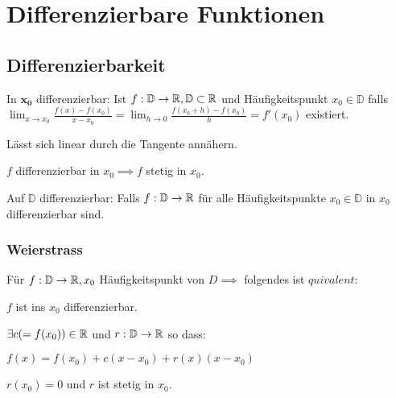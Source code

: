 
\section{Differenzierbare Funktionen}
\subsection{Differenzierbarkeit}
\begin{compactdesc}
    \item[In $\mathbf{x_0}$ differenzierbar:] Ist $f: \mathbb{D} \to \mathbb{R}, \mathbb{D} \subset \mathbb{R}$ und  Häufigkeitspunkt $x_0 \in \mathbb{D}$ falls $\lim_{x \to x_0} \frac{f(x) - f(x_0)}{x - x_0} = \lim_{h \to 0} \frac{f(x_0 + h) - f(x_0)}{h} = f'(x_0)$ existiert.
        \begin{compactitem}
            \item Lässt sich linear durch die Tangente annähern.
            \item $f$ differenzierbar in $x_0 \implies f$ stetig in $x_0$.
        \end{compactitem}
    \item[Auf $\mathbb{D}$ differenzierbar:] Falls $f : \mathbb{D} \to \mathbb{R}$ für alle Häufigkeitspunkte $x_0 \in \mathbb{D}$ in $x_0$ differenzierbar sind.
\end{compactdesc}

\subsubsection{Weierstrass}
Für $f: \mathbb{D} \to \mathbb{R}, x_0$ Häufigkeitspunkt von $D \implies$ folgendes ist $quivalent$:
\begin{compactenum}
    \item $f$ ist ins $x_0$ differenzierbar.
    \item $\exists c (=f(x_0)) \in \mathbb{R}$ und $r: \mathbb{D} \to \mathbb{R}$ so dass:
        \begin{compactenum}
            \item $f(x) = f(x_0) + c(x - x_0) + r(x)(x - x_0)$
            \item $r(x_0) = 0$ und $r$ ist stetig in $x_0$.
        \end{compactenum}
\end{compactenum}

